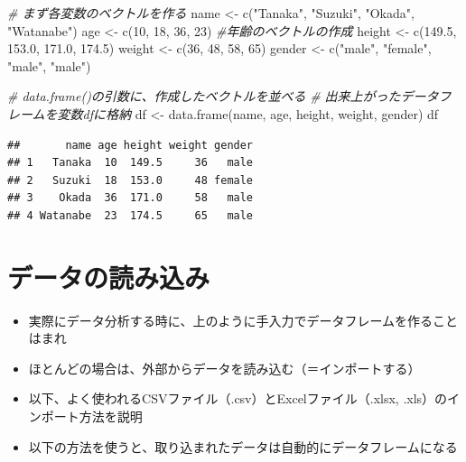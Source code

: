 \documentclass[
]{book}
\newenvironment{Shaded}{\begin{snugshade}}{\end{snugshade}}
\newcommand{\CommentTok}[1]{\textcolor[rgb]{0.56,0.35,0.01}{\textit{#1}}}
\newcommand{\DecValTok}[1]{\textcolor[rgb]{0.00,0.00,0.81}{#1}}
\newcommand{\FloatTok}[1]{\textcolor[rgb]{0.00,0.00,0.81}{#1}}
\newcommand{\FunctionTok}[1]{\textcolor[rgb]{0.00,0.00,0.00}{#1}}
\newcommand{\NormalTok}[1]{#1}
\newcommand{\OtherTok}[1]{\textcolor[rgb]{0.56,0.35,0.01}{#1}}
\newcommand{\StringTok}[1]{\textcolor[rgb]{0.31,0.60,0.02}{#1}}
\providecommand{\tightlist}{%
  \setlength{\itemsep}{0pt}\setlength{\parskip}{0pt}}
\begin{document}
\begin{Shaded}
\begin{Highlighting}[]
\CommentTok{\# まず各変数のベクトルを作る}
\NormalTok{name }\OtherTok{\textless{}{-}} \FunctionTok{c}\NormalTok{(}\StringTok{"Tanaka"}\NormalTok{, }\StringTok{"Suzuki"}\NormalTok{, }\StringTok{"Okada"}\NormalTok{, }\StringTok{"Watanabe"}\NormalTok{)}
\NormalTok{age }\OtherTok{\textless{}{-}} \FunctionTok{c}\NormalTok{(}\DecValTok{10}\NormalTok{, }\DecValTok{18}\NormalTok{, }\DecValTok{36}\NormalTok{, }\DecValTok{23}\NormalTok{) }\CommentTok{\#年齢のベクトルの作成}
\NormalTok{height }\OtherTok{\textless{}{-}} \FunctionTok{c}\NormalTok{(}\FloatTok{149.5}\NormalTok{, }\FloatTok{153.0}\NormalTok{, }\FloatTok{171.0}\NormalTok{, }\FloatTok{174.5}\NormalTok{)}
\NormalTok{weight }\OtherTok{\textless{}{-}} \FunctionTok{c}\NormalTok{(}\DecValTok{36}\NormalTok{, }\DecValTok{48}\NormalTok{, }\DecValTok{58}\NormalTok{, }\DecValTok{65}\NormalTok{)}
\NormalTok{gender }\OtherTok{\textless{}{-}} \FunctionTok{c}\NormalTok{(}\StringTok{"male"}\NormalTok{, }\StringTok{"female"}\NormalTok{, }\StringTok{"male"}\NormalTok{, }\StringTok{"male"}\NormalTok{) }

\CommentTok{\# data.frame()の引数に、作成したベクトルを並べる}
\CommentTok{\# 出来上がったデータフレームを変数dfに格納}
\NormalTok{df }\OtherTok{\textless{}{-}} \FunctionTok{data.frame}\NormalTok{(name, age, height, weight, gender)}
\NormalTok{df}
\end{Highlighting}
\end{Shaded}

\begin{verbatim}
##       name age height weight gender
## 1   Tanaka  10  149.5     36   male
## 2   Suzuki  18  153.0     48 female
## 3    Okada  36  171.0     58   male
## 4 Watanabe  23  174.5     65   male
\end{verbatim}

\hypertarget{ux30c7ux30fcux30bfux306eux8aadux307fux8fbcux307f-1}{%
\section{データの読み込み}\label{ux30c7ux30fcux30bfux306eux8aadux307fux8fbcux307f-1}}

\begin{itemize}
\tightlist
\item
  実際にデータ分析する時に、上のように手入力でデータフレームを作ることはまれ
\item
  ほとんどの場合は、外部からデータを読み込む（＝インポートする）
\item
  以下、よく使われるCSVファイル（.csv）とExcelファイル（.xlsx, .xls）のインポート方法を説明
\item
  以下の方法を使うと、取り込まれたデータは自動的にデータフレームになる
\end{itemize}
\end{document}
